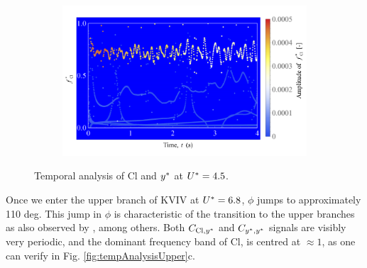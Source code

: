 \documentclass[oneside]{utmthesis}
\begin{document}
\begin{figure} \continuedfloat
  \centering
  \begin{subfigure}[h]{1\textwidth}
    \includegraphics[width=\textwidth]{figs/tempAnalysisKVIV-c}
    \caption{}
    \label{fig:tempAnalysisKVIV-c}
  \end{subfigure}

  \caption{Temporal analysis of Cl and $y^{*}$ at $U^{*} = 4.5$.} \label{fig:tempAnalysisKVIV}
\end{figure}

Once we enter the upper branch of KVIV at  $U^{*} = 6.8$, $\phi$ jumps to approximately 110 deg. This jump in $\phi$ is characteristic of the transition to the upper branches as also observed by \citet{Maruai2018}, among others. Both $C_{\text{Cl},y^{*}}$ and $C_{y^{*},y^{*}}$ signals are visibly very periodic, and the dominant frequency band of Cl, is centred at $\approx 1$, as one can verify in Fig. \ref{fig:tempAnalysisUpper}c.
\end{document}
